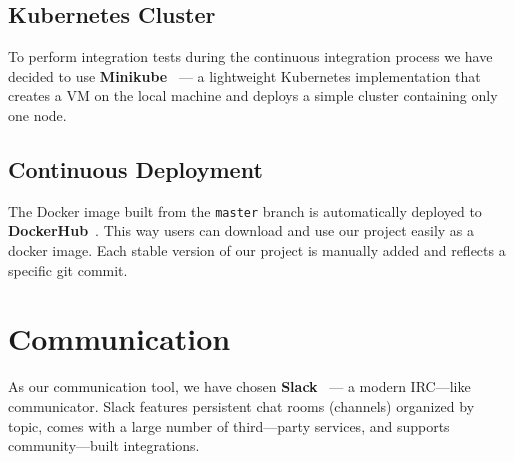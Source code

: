 \subsection{Kubernetes Cluster}
To perform integration tests during the continuous integration process we 
have decided to use \textbf{Minikube}~\cite{minikube} --- a lightweight
Kubernetes implementation that creates a VM on the local machine and deploys 
a simple cluster containing only one node.

\subsection{Continuous Deployment}
The Docker image built from the \texttt{master} branch is automatically 
deployed to \textbf{DockerHub}~\cite{docker}. This way users can download
and use our project easily as a docker image. Each stable version of our 
project is manually added and reflects a specific git commit.

\section{Communication}
As our communication tool, we have chosen \textbf{Slack}~\cite{slack} --- 
a modern IRC---like communicator. Slack features persistent chat rooms
(channels) organized by topic, comes with a large number of third---party 
services, and supports community---built integrations.
